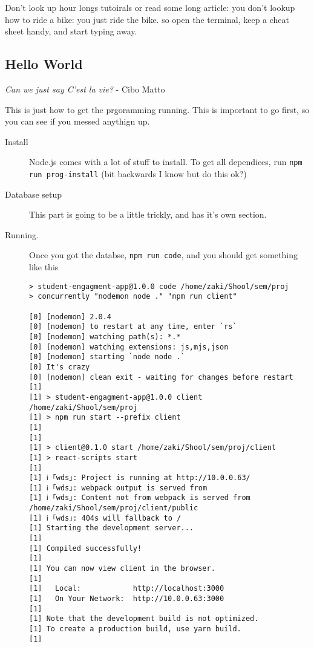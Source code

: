\documentclass[11pt]{article}
\begin{document}
Don't look up hour longs tutoirals or read some long article: you don't lookup how to ride a bike: you just ride the bike. so open the terminal, keep a cheat sheet handy, and start typing away.


\subsection*{Hello World}
\label{sec:org3277ede}
\begin{center}
\emph{Can we just say C'est la vie?} - Cibo Matto
\end{center}
This is just how to get the prgoramming running. This is important to go first, so you can see if you messed anythign up.

\begin{description}
\item[{Install}] Node.js comes with a lot of stuff to install. To get all dependices, run \texttt{npm run prog-install} (bit backwards I know but do this ok?)
\item[{Database setup}] This part is going to be a little trickly, and has it's own section.
\item[{Running.}] Once you got the databse, \texttt{npm run code}, and you should get something like this
\begin{verbatim}
> student-engagment-app@1.0.0 code /home/zaki/Shool/sem/proj
> concurrently "nodemon node ." "npm run client"

[0] [nodemon] 2.0.4
[0] [nodemon] to restart at any time, enter `rs`
[0] [nodemon] watching path(s): *.*
[0] [nodemon] watching extensions: js,mjs,json
[0] [nodemon] starting `node node .`
[0] It's crazy
[0] [nodemon] clean exit - waiting for changes before restart
[1] 
[1] > student-engagment-app@1.0.0 client /home/zaki/Shool/sem/proj
[1] > npm run start --prefix client
[1] 
[1] 
[1] > client@0.1.0 start /home/zaki/Shool/sem/proj/client
[1] > react-scripts start
[1] 
[1] ℹ ｢wds｣: Project is running at http://10.0.0.63/
[1] ℹ ｢wds｣: webpack output is served from 
[1] ℹ ｢wds｣: Content not from webpack is served from /home/zaki/Shool/sem/proj/client/public
[1] ℹ ｢wds｣: 404s will fallback to /
[1] Starting the development server...
[1] 
[1] Compiled successfully!
[1] 
[1] You can now view client in the browser.
[1] 
[1]   Local:            http://localhost:3000
[1]   On Your Network:  http://10.0.0.63:3000
[1] 
[1] Note that the development build is not optimized.
[1] To create a production build, use yarn build.
[1] 



\end{verbatim}
\end{description}
\end{document}
